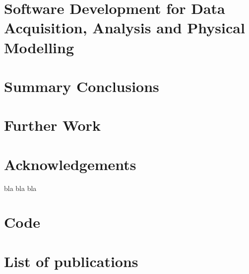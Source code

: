 \documentclass[b5paper, 12pt, openright]{book} %
\begin{document}
\chapter{Software Development for Data Acquisition, Analysis and Physical Modelling}
	\graphicspath{ {./contents_img/software/} }
	

\chapter{Summary Conclusions}


\chapter{Further Work}


\chapter*{Acknowledgements}
bla bla bla

\appendix
\chapter{Code}


\chapter{List of publications}

\printindex

\printbibliography
\end{document}
